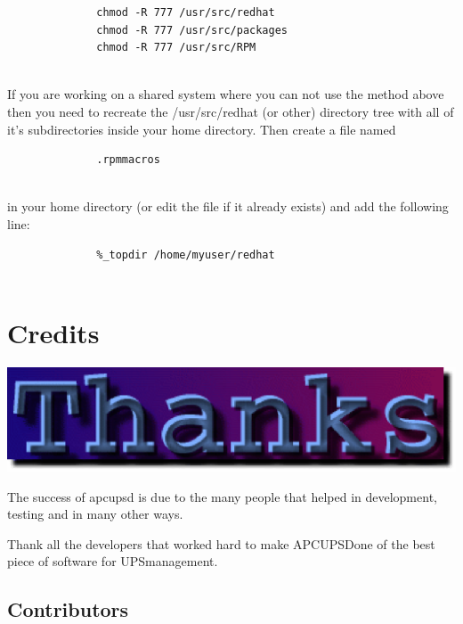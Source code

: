 {{{{{{{{{{{{\begin{description}
\footnotesize
\begin{verbatim}
              chmod -R 777 /usr/src/redhat
              chmod -R 777 /usr/src/packages
              chmod -R 777 /usr/src/RPM
     
\end{verbatim}
\normalsize

If you are working on a shared system where you can not use the method above
then you need to recreate the /usr/src/redhat (or other) directory tree with all 
of it's subdirectories inside your home directory. Then create a file named  

\footnotesize
\begin{verbatim}
              .rpmmacros
     
\end{verbatim}
\normalsize

in your home directory (or edit the file if it already exists) and add the
following line:  

\footnotesize
\begin{verbatim}
              %_topdir /home/myuser/redhat
     
\end{verbatim}
\normalsize

\end{description}

\label{Credits-_003c1_003e}

\section*{Credits}

\includegraphics{./thanks.eps}  

The success of apcupsd is due to the many people that helped in development,
testing and in many other ways.  

Thank all the developers that worked hard to make APCUPSDone of the best piece
of software for UPSmanagement. 

\label{Contributors}

\subsection*{Contributors}

}}}}}}}}}}}}
